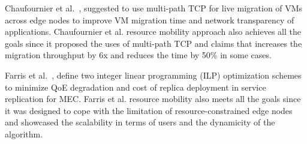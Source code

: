 Chaufournier et al.~\cite{Chaufournier:2017}, suggested to use multi-path TCP for live migration of VMs across edge nodes to improve VM migration time and network transparency of applications.  Chaufournier et al. resource mobility approach also achieves all the goals since it proposed the uses of multi-path TCP and claims that increases the migration throughput by 6x and reduces the time by 50\% in some cases.

Farris et al.~\cite{Farris:2017}, define two integer linear programming (ILP) optimization schemes to minimize QoE degradation and cost of replica deployment in service replication for MEC. Farris et al. resource mobility also meets all the goals since it was designed to cope with the limitation of resource-constrained edge nodes and showcased the scalability in terms of users and the dynamicity of the algorithm.

